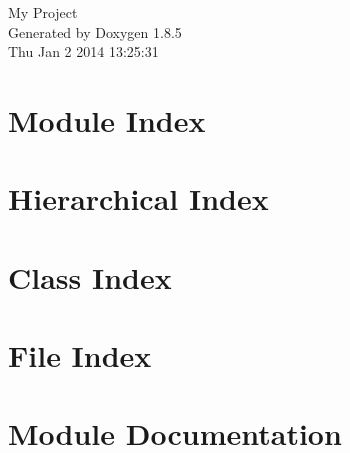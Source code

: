 \documentclass[twoside]{book}
\newcommand{\clearemptydoublepage}{%
  \newpage{\pagestyle{empty}\cleardoublepage}%
}
\begin{document}
\hypersetup{pageanchor=false}
\begin{titlepage}
\vspace*{7cm}
\begin{center}%
{\Large My Project }\\
\vspace*{1cm}
{\large Generated by Doxygen 1.8.5}\\
\vspace*{0.5cm}
{\small Thu Jan 2 2014 13:25:31}\\
\end{center}
\end{titlepage}
\clearemptydoublepage
\tableofcontents
\clearemptydoublepage
{}
\hypersetup{pageanchor=true}

\chapter{Module Index}

\chapter{Hierarchical Index}

\chapter{Class Index}

\chapter{File Index}

\chapter{Module Documentation}





\end{document}

